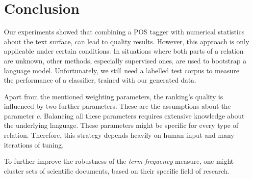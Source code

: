 \documentclass[runningheads]{llncs}
\begin{document}
\section{Conclusion}
Our experiments showed that combining a POS tagger with numerical statistics about the text surface, can lead to quality results. However, this approach is only applicable under certain conditions. In situations where both parts of a relation are unknown, other methods, especially supervised ones, are used to bootstrap a language model. Unfortunately, we still need a labelled test corpus to measure the performance of a classifier, trained with our generated data.


Apart from the mentioned weighting parameters, the ranking's quality is influenced by two further parameters. These are the assumptions about the parameter $c$. Balancing all these parameters requires extensive knowledge about the underlying language. These parameters might be specific for every type of relation. Therefore, this strategy depends heavily on human input and many iterations of tuning.

To further improve the robustness of the \emph{term frequency} measure, one might cluster sets of scientific documents, based on their specific field of research.






\end{document}
